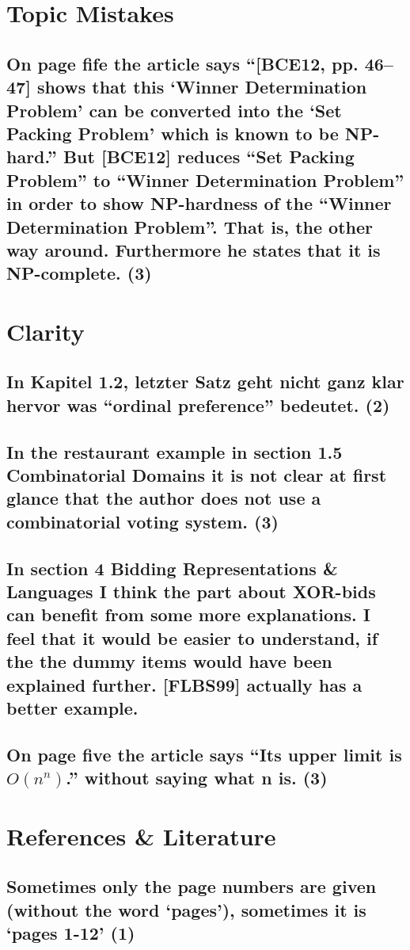 \documentclass{"../../Datenanalyse/assignments/latex-brookesassignment/brookes-assignment"}
\begin{document}
\section{Topic Mistakes}
\subsection{On page fife the article says ``[BCE12, pp. 46–47] shows that this `Winner Determination Problem' can be converted into the `Set Packing Problem' which is known to be NP-hard.'' But [BCE12] reduces ``Set Packing Problem'' to ``Winner Determination Problem'' in order to show NP-hardness of the ``Winner Determination Problem''. That is, the other way around. Furthermore he states that it is NP-complete. (3)}

\section{Clarity}
\subsection{In Kapitel 1.2, letzter Satz geht nicht ganz klar hervor was ``ordinal preference'' bedeutet. (2)}
\subsection{In the restaurant example in section 1.5 Combinatorial Domains it is not clear at first glance that the author does not use a combinatorial voting system. (3)}
\subsection{In section 4 Bidding Representations \& Languages I think the part about XOR-bids can benefit from some more explanations. I feel that it would be easier to understand, if the the dummy items would have been explained further. [FLBS99] actually has a better example.}
\subsection{On page five the article says ``Its upper limit is $O(n^n)$.'' without saying what n is. (3)}

\section{References \& Literature}
\subsection{Sometimes only the page numbers are given (without the word `pages'), sometimes it is `pages 1-12' (1)}
\end{document}
